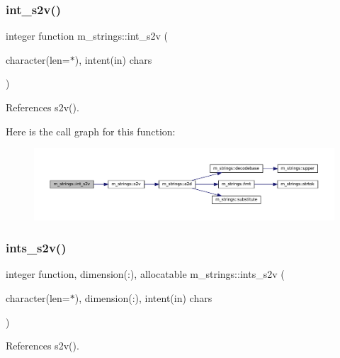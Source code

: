 \subsubsection{\texorpdfstring{int\+\_\+s2v()}{int\_s2v()}}
{\footnotesize\ttfamily integer function m\+\_\+strings\+::int\+\_\+s2v (\begin{DoxyParamCaption}\item[{character(len=$\ast$), intent(in)}]{chars }\end{DoxyParamCaption})\hspace{0.3cm}{\ttfamily [private]}}



References s2v().

Here is the call graph for this function\+:\nopagebreak
\begin{figure}[H]
\begin{center}
\leavevmode
\includegraphics[width=350pt]{namespacem__strings_aa94164439fc7659e175cf639e7315c0d_cgraph}
\end{center}
\end{figure}
\mbox{\label{namespacem__strings_a4e54d205168cab37d25119d74a9ead63}} 
\subsubsection{\texorpdfstring{ints\+\_\+s2v()}{ints\_s2v()}}
{\footnotesize\ttfamily integer function, dimension(\+:), allocatable m\+\_\+strings\+::ints\+\_\+s2v (\begin{DoxyParamCaption}\item[{character(len=$\ast$), dimension(\+:), intent(in)}]{chars }\end{DoxyParamCaption})\hspace{0.3cm}{\ttfamily [private]}}



References s2v().

